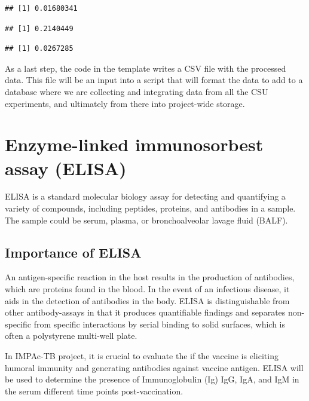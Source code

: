 \documentclass[
]{book}
\begin{document}
\begin{verbatim}
## [1] 0.01680341
\end{verbatim}

\begin{verbatim}
## [1] 0.2140449
\end{verbatim}

\begin{verbatim}
## [1] 0.0267285
\end{verbatim}

As a last step, the code in the template writes a CSV file with the processed
data. This file will be an input into a script that will format the data to
add to a database where we are collecting and integrating data from all the CSU
experiments, and ultimately from there into project-wide storage.

\hypertarget{enzyme-linked-immunosorbest-assay-elisa}{%
\chapter{Enzyme-linked immunosorbest assay (ELISA)}\label{enzyme-linked-immunosorbest-assay-elisa}}

ELISA is a standard molecular biology assay for detecting and quantifying a
variety of compounds, including peptides, proteins, and antibodies in a sample.
The sample could be serum, plasma, or bronchoalveolar lavage fluid (BALF).

\hypertarget{importance-of-elisa}{%
\section{\texorpdfstring{\textbf{Importance of ELISA}}{Importance of ELISA}}\label{importance-of-elisa}}

An antigen-specific reaction in the host results in the production of antibodies, which are proteins found in the blood. In the event of an infectious disease,
it aids in the detection of antibodies in the body. ELISA is distinguishable from other antibody-assays in that it produces quantifiable findings and separates non-specific from specific interactions by serial binding to solid surfaces,
which is often a polystyrene multi-well plate.

In IMPAc-TB project, it is crucial to evaluate the if the vaccine is eliciting humoral immunity and generating antibodies against vaccine antigen. ELISA will
be used to determine the presence of Immunoglobulin (Ig) IgG, IgA, and IgM in
the serum different time points post-vaccination.
\end{document}
